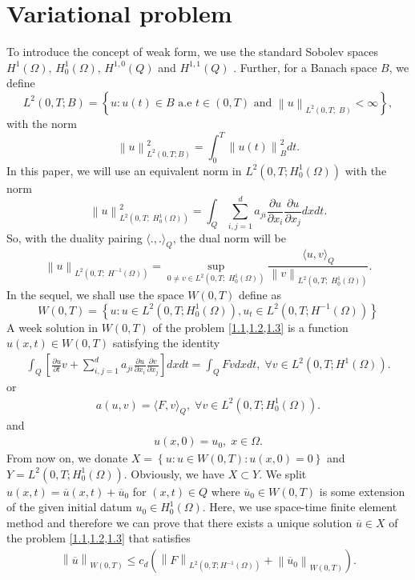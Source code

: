 \documentclass[]{article}
\begin{document}
\section{Variational problem}
To introduce the concept of weak form, we use the standard Sobolev spaces $H^1(\Omega),\, H^1_0(\Omega),\, H^{1, 0}(Q)$ and $H^{1, 1}(Q)$ \cite{b1, b2, b3}. Further, for a Banach space $B$, we define
$$L^2(0, T; B)=\left\{u:u(t)\in B \text{ a.e } t\in (0, T) \text{ and } \left\|u\right\|_{L^2(0, T;\; B)} <\infty \right\},$$
with the norm
$$\left\|u\right\|_{L^2(0, T; B)}^2=\int_0^T\left\|u(t)\right\|^2_Bdt.$$
In this paper, we will use an equivalent norm in $L^2\left(0, T; H^1_0(\Omega)\right)$ with the norm
$$\left\|u\right\|_{L^2(0, T;\; H^1_0(\Omega))}^2=\int_Q \sum_{i, j=1}^{d}a_{ji}\frac{\partial u}{\partial x_i}\frac{\partial u}{\partial x_j}dxdt.$$
So, with the duality pairing $\langle ., .\rangle_Q$, the dual norm will be
$$\left\|u\right\|_{L^2(0, T;\; H^{-1}(\Omega))}=\sup_{0\neq v\in L^2(0, T;\; H^1_0(\Omega))}\frac{\langle u, v\rangle_Q}{\left\|v\right\|_{L^2(0, T;\; H^1_0(\Omega))}}.$$
In the sequel, we shall use the space $W(0, T)$ define as
$$W(0, T)=\left\{u: u\in L^2(0, T; H^1_0(\Omega)), u_t\in L^2\left(0, T; H^{-1}(\Omega) \right)\right\}$$
A week solution in $W(0, T)$ of the problem \cref{1.1,1.2,1.3} is a function $u(x, t)\in W(0, T)$ satisfying the identity
\begin{align}\label{2.1}
	\int_{Q}\left[\frac{\partial u}{\partial t}v+\sum_{i, j=1}^{d}a_{ji}\frac{\partial u}{\partial x_i}\frac{\partial v}{\partial x_j}\right]dxdt=\int_{Q}Fvdxdt,\;\forall v \in L^2\left(0, T; H^1(\Omega)\right).
\end{align}
or 
\begin{align*}
	a(u, v)=\langle F, v\rangle_{Q},\;\forall v \in L^2\left(0, T; H^1_0(\Omega)\right).
\end{align*}
and 
\begin{align}\label{2.2}
	u(x, 0)=u_0,\; x\in \Omega.
\end{align}
From now on, we donate $X=\left\{u: u\in W(0, T): u(x, 0)=0\right\}$ and $Y=L^2\left(0, T; H^1_0(\Omega)\right)$. Obviously, we have $X\subset Y$. We split $u(x, t)=\overline{u}(x, t)+\overline{u}_0$ for $(x, t)\in Q$ where $\overline{u}_0\in W(0, T)$ is some extension of the given initial datum $u_0\in H^1_0(\Omega)$. Here, we use space-time finite element method \cite{a16} and therefore we can prove that there exists a unique solution $\overline{u}\in X$ of the problem \cref{1.1,1.2,1.3} that satisfies 
\begin{align}\label{2.3}
	\left\|\overline{u}\right\|_{W(0, T)} \leq c_d \left(\left\|F\right\|_{L^2\left(0, T; H^{-1}(\Omega)\right)}+\left\|\overline{u}_0\right\|_{W(0, T)}\right).
\end{align}
\end{document}
